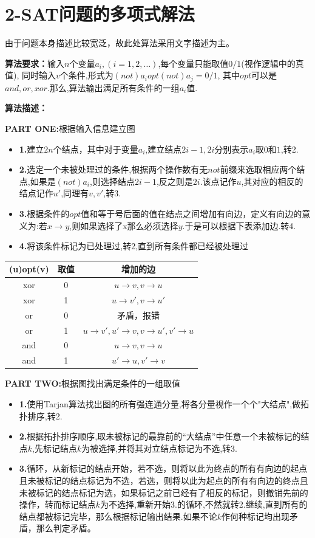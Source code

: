 \documentclass[cn,11pt,chinese]{elegantbook}
\begin{document}
\section{2-SAT问题的多项式解法}
由于问题本身描述比较宽泛，故此处算法采用文字描述为主。

\textbf{算法要求：}输入$ n $个变量$ a_i,(i = 1,2,\dots) $,每个变量只能取值$ 0/1 $(视作逻辑中的真值),
同时输入$ v $个条件,形式为$ (not) a_i opt (not) a_j = 0/1 $,
其中$ opt $可以是$ and,or,xor $.那么,算法输出满足所有条件的一组$ a_i $值.

\textbf{算法描述：}

\textbf{PART ONE:}根据输入信息建立图
\begin{itemize}
	\item \textbf{1.}建立$ 2n $个结点，其中对于变量$ a_i $,建立结点$ 2i-1,2i $分别表示$ a_i $取$ 0 $和$ 1 $,转2.
	\item \textbf{2.}选定一个未被处理过的条件,根据两个操作数有无$ not $前缀来选取相应两个结点,如果是$ (not)a_i $,则选择结点$ 2i-1 $,反之则是$ 2i $.该点记作$ u $,其对应的相反的结点记作$ u' $,同理有$ v,v' $,转3.
	\item \textbf{3.}根据条件的$ opt $值和等于号后面的值在结点之间增加有向边，定义有向边的意义为:若$ x \rightarrow y $,则如果选择了x那么必须选择$ y $.于是可以根据下表添加边.转4.
	\item \textbf{4.}将该条件标记为已处理过,转2,直到所有条件都已经被处理过
\end{itemize}
\begin{center}
	\begin{tabular}{|c|c|c|}
		\hline
		(u)opt(v) & 取值 & 增加的边 \\
		\hline
		xor & 0 & $u\rightarrow v,v\rightarrow u$ \\
		\hline
		xor & 1 & $u\rightarrow v',v\rightarrow u'$ \\
		\hline
		or & 0 & 矛盾，报错 \\
		\hline
		or & 1 & $u\rightarrow v',u'\rightarrow v,v\rightarrow u',v'\rightarrow u$ \\
		\hline
		and & 0 & $u\rightarrow v,v\rightarrow u$ \\
		\hline
		and & 1 & $u'\rightarrow u,v' \rightarrow v$ \\
		\hline
	\end{tabular}
\end{center}

\textbf{PART TWO:}根据图找出满足条件的一组取值
\begin{itemize}
	\item  \textbf{1.}使用Tarjan算法找出图的所有强连通分量,将各分量视作一个个"大结点",做拓扑排序,转2.
	\item  \textbf{2.}根据拓扑排序顺序,取未被标记的最靠前的“大结点”中任意一个未被标记的结点$ k $,先标记结点$ k $为被选择,并将其对立结点标记为不选,转3.
	\item  \textbf{3.}循环，从新标记的结点开始，若不选，则将以此为终点的所有有向边的起点且未被标记的结点标记为不选，若选，则将以此为起点的所有有向边的终点且未被标记的结点标记为选，如果标记之前已经有了相反的标记，则撤销先前的操作，转而标记结点$ k $为不选择,重新开始3.的循环,不然就转2.继续,直到所有的结点都被标记完毕，那么根据标记输出结果.如果不论$ k $作何种标记均出现矛盾，那么判定矛盾。
\end{itemize}
\end{document}
